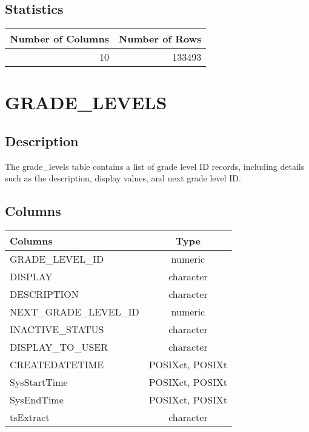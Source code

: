 \documentclass[
  letterpaper,
  DIV=11,
  numbers=noendperiod]{scrreprt}
\begin{document}
\hypertarget{statistics-12}{%
\section*{Statistics}\label{statistics-12}}

\begin{longtable}{rr}
\toprule
Number of Columns & Number of Rows \\ 
\midrule
10 & 133493 \\ 
\bottomrule
\end{longtable}

\hypertarget{grade_levels}{%
\chapter*{GRADE\_LEVELS}\label{grade_levels}}

\hypertarget{description-13}{%
\section*{Description}\label{description-13}}

The grade\_levels table contains a list of grade level ID records,
including details such as the description, display values, and next
grade level ID.

\hypertarget{columns-13}{%
\section*{Columns}\label{columns-13}}

\begin{longtable}{lc}
\toprule
Columns & Type \\ 
\midrule
GRADE\_LEVEL\_ID & numeric \\ 
DISPLAY & character \\ 
DESCRIPTION & character \\ 
NEXT\_GRADE\_LEVEL\_ID & numeric \\ 
INACTIVE\_STATUS & character \\ 
DISPLAY\_TO\_USER & character \\ 
CREATEDATETIME & POSIXct, POSIXt \\ 
SysStartTime & POSIXct, POSIXt \\ 
SysEndTime & POSIXct, POSIXt \\ 
tsExtract & character \\ 
\bottomrule
\end{longtable}
\end{document}
